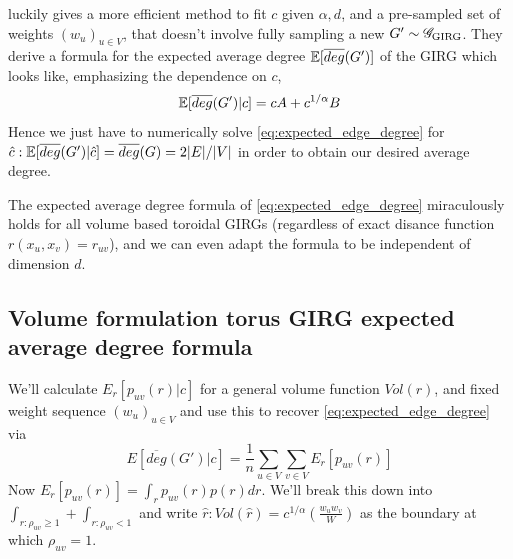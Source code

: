 \cite{blasius2022efficiently} luckily gives a more efficient method to fit $c$ given $\alpha, d$, and a pre-sampled set of weights $(w_u)_{u \in V}$, that doesn't involve fully sampling a new $G' \sim \mathscr{G}_{\mathrm{GIRG}}$. They derive a formula for the expected average degree $\mathbb{E}[\overline{deg}(G')]$ of the GIRG which looks like, emphasizing the dependence on $c$,
\begin{equation}
    \label{eq:expected_edge_degree}
    \mathbb{E}[\overline{deg}(G') | c] = c A + c^{1/\alpha} B
\end{equation}
Hence we just have to numerically solve \cref{eq:expected_edge_degree} for $\hat{c}: \mathbb{E}[\overline{deg}(G') | \hat{c}] = \overline{deg}(G) = 2 |E|/|V|$ in order to obtain our desired average degree.

The expected average degree formula of \cref{eq:expected_edge_degree} miraculously holds for all volume based toroidal GIRGs (regardless of exact disance function $r(x_u, x_v) = r_{uv}$), and we can even adapt the formula to be independent of dimension $d$.

\subsection{Volume formulation torus GIRG expected average degree formula}
\label{subsec:average_degree_formula}

We'll calculate $E_r[p_{uv}(r) | c]$ for a general volume function $Vol(r)$, and fixed weight sequence $(w_u)_{u \in V}$ and use this to recover \cref{eq:expected_edge_degree} via 
\begin{equation}
    E[\overline{deg}(G') | c] = \frac{1}{n} \sum_{u \in V} \sum_{v \in V} E_r[p_{uv}(r)]
\end{equation}
Now $E_r[p_{uv}(r)] = \int_r p_{uv}(r) p(r) dr$. We'll break this down into $\int_{r: \rho_{uv} \geq 1} + \int_{r: \rho_{uv} < 1}$ and write $\hat{r} : Vol(\hat{r}) = c^{1/\alpha} \left ( \frac{w_u w_v}{W} \right )$ as the boundary at which $\rho_{uv} = 1$.

